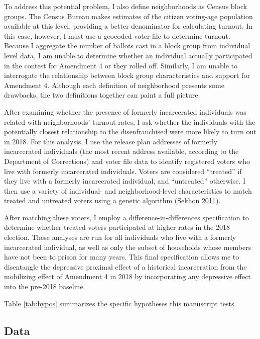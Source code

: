 \documentclass[
  12pt,
]{article}
\begin{document}
To address this potential problem, I also define neighborhoods as Census block groups. The Census Bureau makes estimates of the citizen voting-age population available at this level, providing a better denominator for calculating turnout. In this case, however, I must use a geocoded voter file to determine turnout. Because I aggregate the number of ballots cast in a block group from individual level data, I am unable to determine whether an individual actually participated in the contest for Amendment 4 or they rolled off. Similarly, I am unable to interrogate the relationship between block group characteristics and support for Amendment 4. Although each definition of neighborhood presents some drawbacks, the two definitions together can paint a full picture.

After examining whether the presence of formerly incarcerated individuals was related with neighborhoods' turnout rates, I ask whether the individuals with the potentially closest relationship to the disenfranchised were more likely to turn out in 2018. For this analysis, I use the release plan addresses of formerly incarcerated individuals (the most recent address available, according to the Department of Corrections) and voter file data to identify registered voters who live with formerly incarcerated individuals. Voters are considered ``treated'' if they live with a formerly incarcerated individual, and ``untreated'' otherwise. I then use a variety of individual- and neighborhood-level characteristics to match treated and untreated voters using a genetic algorithm (Sekhon \protect\hyperlink{ref-Sekhon2011}{2011}).

After matching these voters, I employ a difference-in-differences specification to determine whether treated voters participated at higher rates in the 2018 election. These analyses are run for all individuals who live with a formerly incarcerated individual, as well as only the subset of households whose members have not been to prison for many years. This final specification allows me to disentangle the depressive proximal effect of a historical incarceration from the mobilizing effect of Amendment 4 in 2018 by incorporating any depressive effect into the pre-2018 baseline.

Table \ref{tab:hypos} summarizes the specific hypotheses this manuscript tests.



\hypertarget{data}{%
\subsection*{Data}\label{data}}
\end{document}
